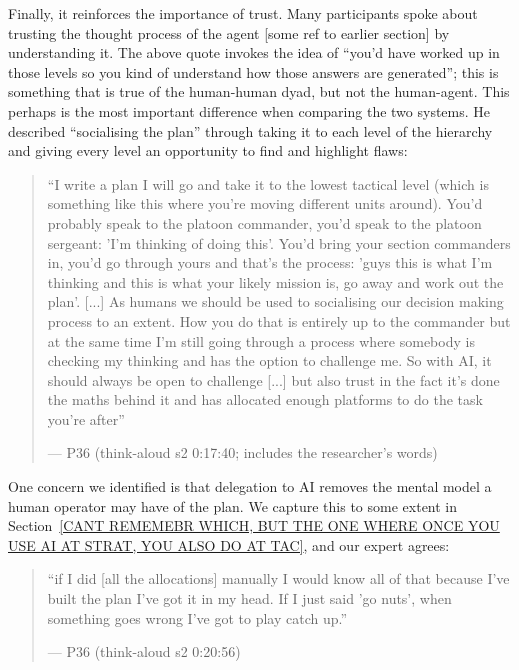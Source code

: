 Finally, it reinforces the importance of trust. Many participants spoke about trusting the thought process of the agent [some ref to earlier section] by understanding it. The above quote invokes the idea of ``you'd have worked up in those levels so you kind of understand how those answers are generated''; this is something that is true of the human-human dyad, but not the human-agent. This perhaps is the most important difference when comparing the two systems. He described ``socialising the plan'' through taking it to each level of the hierarchy and giving every level an opportunity to find and highlight flaws:

\begin{quote}\small
``I write a plan I will go and take it to the lowest tactical level (which is something like this where you're moving different units around). You'd probably speak to the platoon commander, you'd speak to the platoon sergeant: 'I'm thinking of doing this'. You'd bring your section commanders in, you'd go through yours and that's the process: 'guys this is what I'm thinking and this is what your likely mission is, go away and work out the plan'. [...] As humans we should be used to socialising our decision making process to an extent. How you do that is entirely up to the commander but at the same time I'm still going through a process where somebody is checking my thinking and has the option to challenge me. So with AI, it should always be open to challenge [...] but also trust in the fact it's done the maths behind it and has allocated enough platforms to do the task you're after''\par\hfill--- P36 (think-aloud s2 0:17:40; includes the researcher's words)
\end{quote}

One concern we identified is that delegation to AI removes the mental model a human operator may have of the plan. We capture this to some extent in Section~\ref{CANT REMEMEBR WHICH, BUT THE ONE WHERE ONCE YOU USE AI AT STRAT, YOU ALSO DO AT TAC}, and our expert agrees:

\begin{quote}\small
``if I did [all the allocations] manually I would know all of that because I've built the plan I've got it in my head. If I just said 'go nuts', when something goes wrong I've got to play catch up.''\par\hfill--- P36 (think-aloud s2 0:20:56)
\end{quote}




